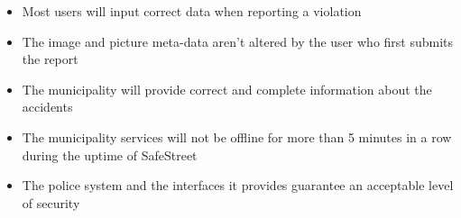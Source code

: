 \begin{itemize}
    \item Most users will input correct data when reporting a violation
    \item The image and picture meta-data aren't altered by the user who first submits the report
    \item The municipality will provide correct and complete information about the accidents
    \item The municipality services will not be offline for more than 5 minutes in a row during the uptime of SafeStreet
    \item The police system and the interfaces it provides guarantee an acceptable level of security
\end{itemize}